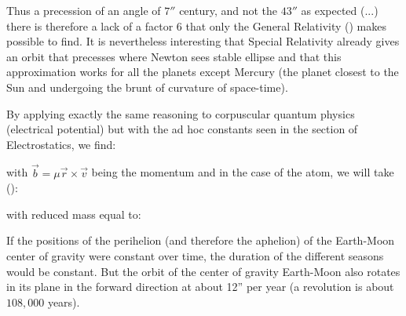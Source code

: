 	Thus a precession of an angle of $7''$ century, and not the $43''$ as expected (...) there is therefore a lack of a factor $6$ that only the General Relativity () makes possible to find. It is nevertheless interesting that Special Relativity already gives an orbit that precesses where Newton sees stable ellipse and that this approximation works for all the planets except Mercury (the planet closest to the Sun and undergoing the brunt of curvature of space-time).
	\begin{tcolorbox}[title=Remark,colframe=black,arc=10pt]
	By applying exactly the same reasoning to corpuscular quantum physics (electrical potential) but with the ad hoc constants seen in the section of Electrostatics, we find:
	
	with $\vec{b}=\mu\vec{r}\times\vec{v}$ being the momentum and in the case of the atom, we will take ():
	
	with reduced mass equal to:
	
	\end{tcolorbox}
	If the positions of the perihelion (and therefore the aphelion) of the Earth-Moon center of gravity  were constant over time, the duration of the different seasons would be constant. But the orbit of the center of gravity Earth-Moon also rotates in its plane in the forward direction at about 12'' per year (a revolution is about $108,000$ years).


